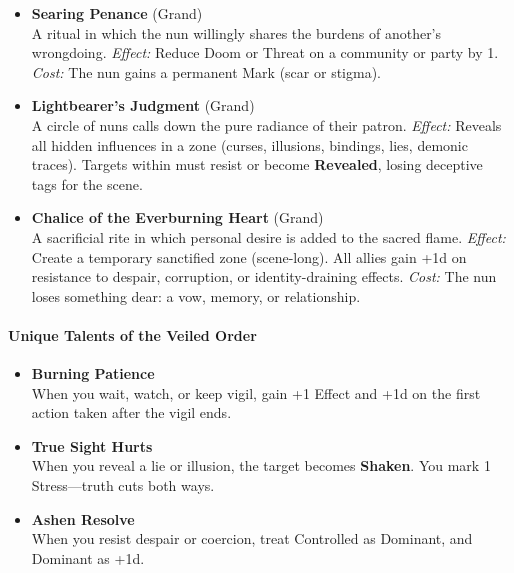 \documentclass[11pt]{book}
\begin{document}
\begin{itemize}[leftmargin=1.5em]

    \item \textbf{Searing Penance} (Grand) \\
    A ritual in which the nun willingly shares the burdens of another's  
    wrongdoing.  
    \emph{Effect:} Reduce Doom or Threat on a community or party by 1.  
    \emph{Cost:} The nun gains a permanent Mark (scar or stigma).

    \item \textbf{Lightbearer's Judgment} (Grand) \\
    A circle of nuns calls down the pure radiance of their patron.  
    \emph{Effect:} Reveals all hidden influences in a zone (curses, illusions,  
    bindings, lies, demonic traces). Targets within must resist or become  
    \textbf{Revealed}, losing deceptive tags for the scene.

    \item \textbf{Chalice of the Everburning Heart} (Grand) \\
    A sacrificial rite in which personal desire is added to the sacred flame.  
    \emph{Effect:} Create a temporary sanctified zone (scene-long).  
    All allies gain +1d on resistance to despair, corruption, or  
    identity-draining effects.  
    \emph{Cost:} The nun loses something dear: a vow, memory, or relationship.

\end{itemize}

\paragraph{Unique Talents of the Veiled Order}

\begin{itemize}[leftmargin=1.5em]

    \item \textbf{Burning Patience} \\
    When you wait, watch, or keep vigil, gain +1 Effect and +1d  
    on the first action taken after the vigil ends.

    \item \textbf{True Sight Hurts} \\
    When you reveal a lie or illusion, the target becomes \textbf{Shaken}.  
    You mark 1 Stress---truth cuts both ways.

    \item \textbf{Ashen Resolve} \\
    When you resist despair or coercion, treat Controlled as Dominant,  
    and Dominant as +1d.

\end{itemize}
\end{document}
